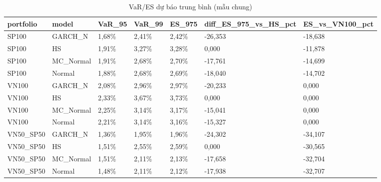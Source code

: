 \begin{table}
\caption{VaR/ES dự báo trung bình (mẫu chung)}
\label{tab:T4_var_es_overall}
\begin{tabular}{lllllll}
\toprule
portfolio & model & VaR\_95 & VaR\_99 & ES\_975 & diff\_ES\_975\_vs\_HS\_pct & ES\_vs\_VN100\_pct \\
\midrule
SP100 & GARCH\_N & 1,68\% & 2,41\% & 2,42\% & -26,353 & -18,638 \\
SP100 & HS & 1,91\% & 3,27\% & 3,28\% & 0,000 & -11,878 \\
SP100 & MC\_Normal & 1,91\% & 2,68\% & 2,70\% & -17,761 & -14,699 \\
SP100 & Normal & 1,88\% & 2,68\% & 2,69\% & -18,040 & -14,702 \\
VN100 & GARCH\_N & 2,08\% & 2,96\% & 2,97\% & -20,233 & 0,000 \\
VN100 & HS & 2,33\% & 3,67\% & 3,73\% & 0,000 & 0,000 \\
VN100 & MC\_Normal & 2,25\% & 3,14\% & 3,17\% & -15,041 & 0,000 \\
VN100 & Normal & 2,21\% & 3,14\% & 3,16\% & -15,327 & 0,000 \\
VN50\_SP50 & GARCH\_N & 1,36\% & 1,95\% & 1,96\% & -24,302 & -34,107 \\
VN50\_SP50 & HS & 1,51\% & 2,55\% & 2,59\% & 0,000 & -30,565 \\
VN50\_SP50 & MC\_Normal & 1,51\% & 2,11\% & 2,13\% & -17,658 & -32,704 \\
VN50\_SP50 & Normal & 1,48\% & 2,11\% & 2,12\% & -17,938 & -32,707 \\
\bottomrule
\end{tabular}
\end{table}

